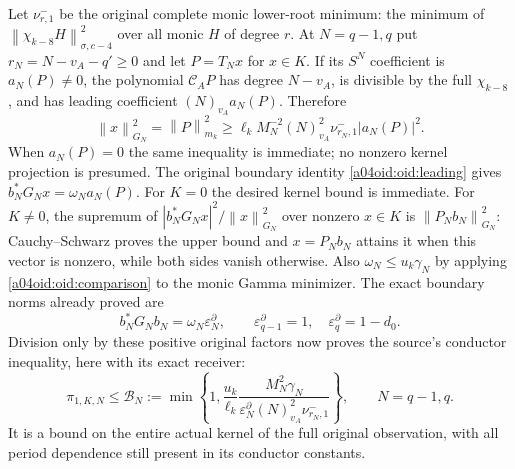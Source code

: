 \documentclass[11pt,a4paper]{article}
\providecommand{\norm}[1]{\left\lVert#1\right\rVert}
\begin{document}
Let $\nu^-_{r,1}$ be the original complete monic lower-root minimum:
the minimum of
$\norm{\chi_{k-8}H}_{\sigma,c-4}^2$ over all monic $H$ of degree
$r$. At $N=q-1,q$ put $r_N=N-v_A-q'\ge0$ and let
$P=T_Nx$ for $x\in K$. If its $S^N$ coefficient is $a_N(P)\ne0$,
the polynomial $\mathcal C_AP$ has degree $N-v_A$, is divisible
by the full $\chi_{k-8}$, and has leading coefficient
$(N)_{v_A}a_N(P)$. Therefore
\begin{equation}\label{a04oid:oid:kernelcoefficient}
 \norm{x}_{G_N}^2=\norm P_{m_k}^2
 \ge\ell_k M_N^{-2}(N)_{v_A}^2
 \nu^-_{r_N,1}|a_N(P)|^2.
\end{equation}
When $a_N(P)=0$ the same inequality is immediate; no nonzero kernel
projection is presumed. The original boundary identity
\eqref{a04oid:oid:leading} gives
$b_N^*G_Nx=\omega_Na_N(P)$.
For $K=0$ the desired kernel bound is immediate. For $K\ne0$, the
supremum of $|b_N^*G_Nx|^2/\norm x_{G_N}^2$ over nonzero
$x\in K$ is $\norm{P_Nb_N}_{G_N}^2$: Cauchy--Schwarz proves
the upper bound and $x=P_Nb_N$ attains it when this vector is
nonzero, while both sides vanish otherwise.
Also $\omega_N\le u_k\gamma_N$ by applying
\eqref{a04oid:oid:comparison} to the monic Gamma minimizer.
The exact boundary norms already proved are
\[
 b_N^*G_Nb_N=\omega_N\varepsilon_N^\partial,
 \qquad\varepsilon_{q-1}^\partial=1,\quad
 \varepsilon_q^\partial=1-d_0.
\]
Division only by these positive original factors now proves the
source's conductor inequality, here with its exact receiver:
\begin{equation}\label{a04oid:oid:finitepi}
 \boxed{\pi_{1,K,N}\le\mathcal B_N:=
 \min\left\{1,\frac{u_k}{\ell_k}
 \frac{M_N^2\gamma_N}
 {\varepsilon_N^\partial(N)_{v_A}^2\nu^-_{r_N,1}}\right\},
 \qquad N=q-1,q.}
\end{equation}
It is a bound on the entire actual kernel of the full original
observation, with all period dependence still present in its
conductor constants.
\end{document}
